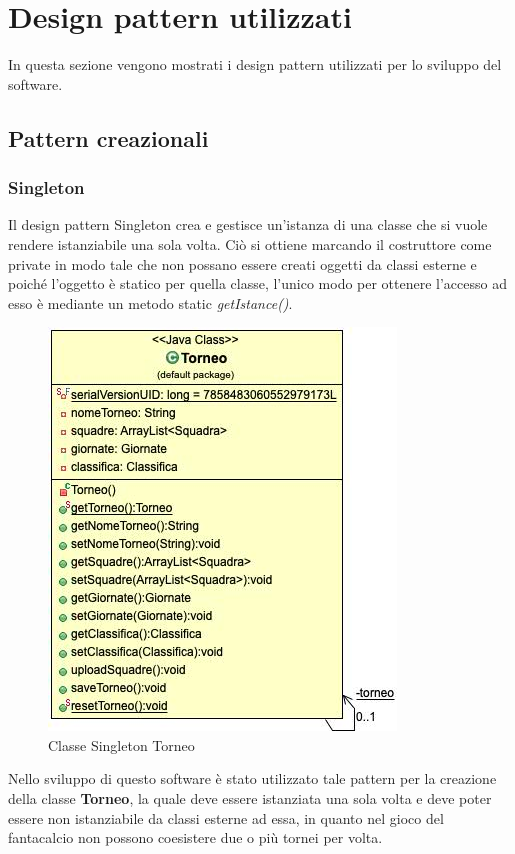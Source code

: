 \documentclass[12pt,a4paper]{article}
\begin{document}
\section{Design pattern utilizzati}
 In questa sezione vengono mostrati i design pattern utilizzati per lo sviluppo del software.
 \subsection{Pattern creazionali}
 \subsubsection{Singleton}
 Il design pattern Singleton crea e gestisce un'istanza di una classe che si vuole rendere istanziabile una sola volta. Ciò si ottiene marcando il costruttore come private in modo tale che non possano essere creati oggetti da classi esterne  e poiché l'oggetto è statico per quella classe, l'unico modo per ottenere l'accesso ad esso è  mediante  un metodo static \textit{getIstance()}.
 \begin{figure}[h]
\centering
\includegraphics[width=11 cm,keepaspectratio]{Singleton.jpg}
\caption{Classe Singleton Torneo}
\end{figure}
Nello sviluppo di  questo software è stato utilizzato tale pattern per la creazione della classe \textbf{Torneo}, la quale deve essere istanziata una sola volta e  deve poter essere non istanziabile da classi esterne ad essa, in quanto nel gioco del fantacalcio non possono coesistere due o più tornei per volta.
\newpage
\end{document}
